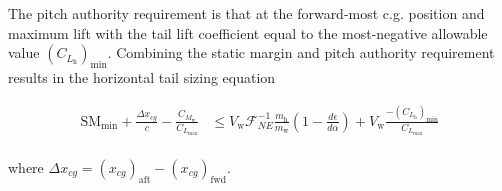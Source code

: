 The pitch authority requirement is that at the forward-most c.g. position and maximum lift with the tail lift coefficient equal to the most-negative allowable value $(C_{L_{\text{h}}})_{\text{min}}$. Combining the static margin and pitch authority requirement results in the horizontal tail sizing equation 

\begin{align}
    \text{SM}_{\text{min}} + \frac{\Delta x_{cg}}{c} - \frac{C_{M_{\text{w}}}}{C_{L_{\text{max}}}} &\leq V_{\text{w}} \mathcal{F}_{NE}^{-1} \frac{m_{\text{h}}}{m_{\text{w}}} \left( 1 - \frac{d\epsilon}{d\alpha}\right) + V_{\text{w}} \frac{-(C_{L_{\text{h}}})_{\text{min}}}{C_{L_{\text{max}}}} \\
\end{align}

where $\Delta x_{cg} = (x_{cg})_{\text{aft}} - (x_{cg})_{\text{fwd}}$.
